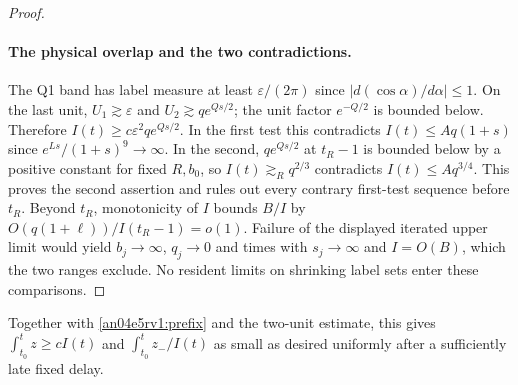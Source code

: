 \documentclass[11pt]{article}
\newcommand{\eps}{\varepsilon}
\begin{document}
\begin{proof}
\paragraph{The physical overlap and the two contradictions.}
The Q1 band has label measure at least $\eps/(2\pi)$ since $|d(\cos\alpha)/d\alpha|\le1$. On the last unit, $U_1\gtrsim\eps$ and $U_2\gtrsim q e^{Qs/2}$; the unit factor $e^{-Q/2}$ is bounded below. Therefore $I(t)\ge c\eps^2 q e^{Qs/2}$. In the first test this contradicts $I(t)\le A q(1+s)$ since $e^{Ls}/(1+s)^9\to\infty$. In the second, $q e^{Qs/2}$ at $t_R-1$ is bounded below by a positive constant for fixed $R,b_0$, so $I(t)\gtrsim_R q^{2/3}$ contradicts $I(t)\le A q^{3/4}$. This proves the second assertion and rules out every contrary first-test sequence before $t_R$. Beyond $t_R$, monotonicity of $I$ bounds $B/I$ by $O(q(1+\ell))/I(t_R-1)=o(1)$. Failure of the displayed iterated upper limit would yield $b_j\to\infty$, $q_j\to0$ and times with $s_j\to\infty$ and $I=O(B)$, which the two ranges exclude. No resident limits on shrinking label sets enter these comparisons.
\end{proof}
Together with \eqref{an04e5rv1:prefix} and the two-unit estimate, this gives $\int_{t_0}^t z\ge c I(t)$ and $\int_{t_0}^t z_-/I(t)$ as small as desired uniformly after a sufficiently late fixed delay.
\end{document}
